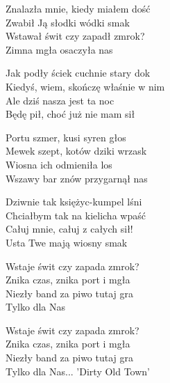 \begin{text}
    Znalazła mnie, kiedy miałem dość\\
    Zwabił Ją słodki wódki smak\\
    Wstawał świt czy zapadł zmrok?\\
    Zimna mgła osaczyła nas

    Jak podły ściek cuchnie stary dok\\
    Kiedyś, wiem, skończę właśnie w nim\\
    Ale dziś nasza jest ta noc\\
    Będę pił, choć już nie mam sił

    Portu szmer, kusi syren głos\\
    Mewek szept, kotów dziki wrzask\\
    Wiosna ich odmieniła los\\
    Wszawy bar znów przygarnął nas

    \vin Dziwnie tak księżyc-kumpel lśni\\
    \vin Chciałbym tak na kielicha wpaść\\
    \vin Całuj mnie, całuj z całych sił!\\
    \vin Usta Twe mają wiosny smak

    Wstaje świt czy zapada zmrok?\\
    Znika czas, znika port i mgła\\
    Niezły band za piwo tutaj gra\\
    Tylko dla Nas

    Wstaje świt czy zapada zmrok?\\
    Znika czas, znika port i mgła\\
    Niezły band za piwo tutaj gra\\
    Tylko dla Nas... 'Dirty Old Town'
\end{text}
\begin{chord}

\end{chord}